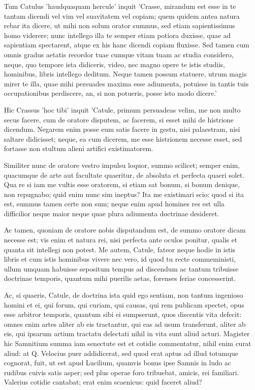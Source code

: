  Tum Catulus 'haudquaquam hercule' inquit 'Crasse, mirandum est esse in te tantam dicendi vel vim vel suavitatem vel copiam; quem quidem antea natura rebar ita dicere, ut mihi non solum orator summus, sed etiam sapientissimus homo viderere; nunc intellego illa te semper etiam potiora duxisse, quae ad sapientiam spectarent, atque ex his hanc dicendi copiam fluxisse. Sed tamen cum omnis gradus aetatis recordor tuae cumque vitam tuam ac studia considero, neque, quo tempore ista didiceris, video, nec magno opere te istis studiis, hominibus, libris intellego deditum. Neque tamen possum statuere, utrum magis mirer te illa, quae mihi persuades maxima esse adiumenta, potuisse in tantis tuis occupationibus perdiscere, an, si non potueris, posse isto modo dicere.'

 Hic Crassus 'hoc tibi' inquit 'Catule, primum persuadeas velim, me non multo secus facere, cum de oratore disputem, ac facerem, si esset mihi de histrione dicendum. Negarem enim posse eum satis facere in gestu, nisi palaestram, nisi saltare didicisset; neque, ea cum dicerem, me esse histrionem necesse esset, sed fortasse non stultum alieni artifici existimatorem.

 Similiter nunc de oratore vestro impulsu loquor, summo scilicet; semper enim, quacumque de arte aut facultate quaeritur, de absoluta et perfecta quaeri solet. Qua re si iam me vultis esse oratorem, si etiam sat bonum, si bonum denique, non repugnabo; quid enim nunc sim ineptus? Ita me existimari scio: quod si ita est, summus tamen certe non sum; neque enim apud homines res est ulla difficilior neque maior neque quae plura adiumenta doctrinae desideret.

 Ac tamen, quoniam de oratore nobis disputandum est, de summo oratore dicam necesse est; vis enim et natura rei, nisi perfecta ante oculos ponitur, qualis et quanta sit intellegi non potest. Me autem, Catule, fateor neque hodie in istis libris et cum istis hominibus vivere nec vero, id quod tu recte commeministi, ullum umquam habuisse sepositum tempus ad discendum ac tantum tribuisse doctrinae temporis, quantum mihi puerilis aetas, forenses feriae concesserint.

 Ac, si quaeris, Catule, de doctrina ista quid ego sentiam, non tantum ingenioso homini et ei, qui forum, qui curiam, qui causas, qui rem publicam spectet, opus esse arbitror temporis, quantum sibi ei sumpserunt, quos discentis vita defecit: omnes enim artes aliter ab eis tractantur, qui eas ad usum transferunt, aliter ab eis, qui ipsarum artium tractatu delectati nihil in vita sunt aliud acturi. Magister hic Samnitium summa iam senectute est et cotidie commentatur, nihil enim curat aliud: at Q. Velocius puer addidicerat, sed quod erat aptus ad illud totumque cognorat, fuit, ut est apud Lucilium, quamvis bonus ipse Samnis in ludo ac rudibus cuivis satis asper; sed plus operae foro tribuebat, amicis, rei familiari. Valerius cotidie cantabat; erat enim scaenicus: quid faceret aliud?

